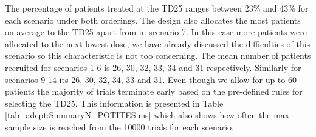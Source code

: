 The percentage of patients treated at the TD25 ranges between 23\% and 43\% for each scenario under both orderings. The design also allocates the most patients on average to the TD25 apart from in scenario 7. In this case more patients were allocated to the next lowest dose, we have already discussed the difficulties of this scenario so this characteristic is not too concerning. The mean number of patients recruited for scenarios 1-6 is 26, 30, 32, 33, 34 and 31 respectively. Similarly for scenarios 9-14 its 26, 30, 32, 34, 33 and 31. Even though we allow for up to 60 patients the majority of trials terminate early based on the pre-defined rules for selecting the TD25. This information is presented in Table \ref{tab_adept:SummaryN_POTITESims} which also shows how often the max sample size is reached from the 10000 trials for each scenario. 

